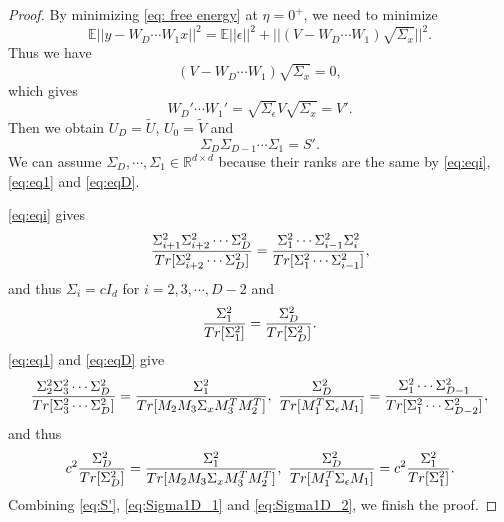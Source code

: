 \documentclass[10pt,a4paper]{amsart}
\newcommand{\Tr}{{\rm Tr}}
\begin{document}
\begin{proof}
By minimizing \eqref{eq: free energy} at $\eta=0^+$, we need to minimize
\begin{equation}
\mathbb{E}||y-W_D\cdots W_1x||^2=\mathbb{E}||\epsilon||^2+||(V-W_D\cdots W_1)\sqrt{\Sigma_x}||^2.
\end{equation}
Thus we have
\begin{equation}
(V-W_D\cdots W_1)\sqrt{\Sigma_x}=0,
\end{equation}
which gives
\begin{equation}
W_D'\cdots W_1'=\sqrt{\Sigma_\epsilon}V\sqrt{\Sigma_x}=V'.
\end{equation}
Then we obtain $U_D=\tilde{U}$, $U_0=\tilde{V}$ and
\begin{equation}
\Sigma_D\Sigma_{D-1}\cdots\Sigma_1=S'.
\label{eq:S'}
\end{equation}
We can assume $\Sigma_D,\cdots,\Sigma_1\in\mathbb{R}^{d\times d}$ because their ranks are the same by \eqref{eq:eqi}, \eqref{eq:eq1} and \eqref{eq:eqD}.

\eqref{eq:eqi} gives
\begin{equation}
\frac{\Sigma_{i+1}^2\Sigma_{i+2}^2\cdots\Sigma_D^2}{\Tr [\Sigma_{i+2}^2\cdots\Sigma_D^2]}=\frac{\Sigma_1^2\cdots\Sigma_{i-1}^2\Sigma_i^2}{\Tr[\Sigma_1^2\cdots\Sigma_{i-1}^2]},
\end{equation}
and thus $\Sigma_i=cI_d$ for $i=2,3,\cdots,D-2$ and
\begin{equation}
\frac{\Sigma_1^2}{\Tr[\Sigma_1^2]}=\frac{\Sigma_D^2}{\Tr[\Sigma_D^2]}.
\label{eq:Sigma1D_1}
\end{equation}
\eqref{eq:eq1} and \eqref{eq:eqD} give
\begin{equation}
\frac{\Sigma_{2}^2\Sigma_{3}^2\cdots\Sigma_D^2}{\Tr [\Sigma_{3}^2\cdots\Sigma_D^2]}=\frac{\Sigma_1^2}{\Tr[M_2M_3\Sigma_xM_3^TM_2^T]},\ \frac{\Sigma_D^2}{\Tr[M_1^T\Sigma_\epsilon M_1]}=\frac{\Sigma_1^2\cdots\Sigma_{D-1}^2}{\Tr[\Sigma_1^2\cdots\Sigma_{D-2}^2]},
\end{equation}
and thus
\begin{equation}
c^2\frac{\Sigma_D^2}{\Tr[\Sigma_D^2]}=\frac{\Sigma_1^2}{\Tr[M_2M_3\Sigma_xM_3^TM_2^T]},\ \frac{\Sigma_D^2}{\Tr[M_1^T\Sigma_\epsilon M_1]}=c^2\frac{\Sigma_1^2}{\Tr[\Sigma_1^2]}.
\label{eq:Sigma1D_2}
\end{equation}
Combining \eqref{eq:S'}, \eqref{eq:Sigma1D_1} and \eqref{eq:Sigma1D_2}, we finish the proof.

\end{proof}
\end{document}
